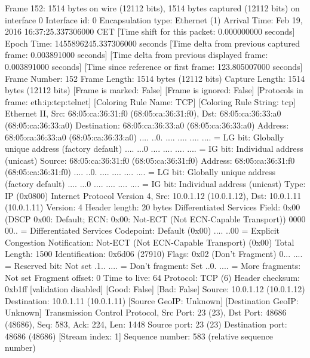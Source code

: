 Frame 152: 1514 bytes on wire (12112 bits), 1514 bytes captured (12112 bits) on interface 0
    Interface id: 0
    Encapsulation type: Ethernet (1)
    Arrival Time: Feb 19, 2016 16:37:25.337306000 CET
    [Time shift for this packet: 0.000000000 seconds]
    Epoch Time: 1455896245.337306000 seconds
    [Time delta from previous captured frame: 0.003891000 seconds]
    [Time delta from previous displayed frame: 0.003891000 seconds]
    [Time since reference or first frame: 123.805007000 seconds]
    Frame Number: 152
    Frame Length: 1514 bytes (12112 bits)
    Capture Length: 1514 bytes (12112 bits)
    [Frame is marked: False]
    [Frame is ignored: False]
    [Protocols in frame: eth:ip:tcp:telnet]
    [Coloring Rule Name: TCP]
    [Coloring Rule String: tcp]
Ethernet II, Src: 68:05:ca:36:31:f0 (68:05:ca:36:31:f0), Dst: 68:05:ca:36:33:a0 (68:05:ca:36:33:a0)
    Destination: 68:05:ca:36:33:a0 (68:05:ca:36:33:a0)
        Address: 68:05:ca:36:33:a0 (68:05:ca:36:33:a0)
        .... ..0. .... .... .... .... = LG bit: Globally unique address (factory default)
        .... ...0 .... .... .... .... = IG bit: Individual address (unicast)
    Source: 68:05:ca:36:31:f0 (68:05:ca:36:31:f0)
        Address: 68:05:ca:36:31:f0 (68:05:ca:36:31:f0)
        .... ..0. .... .... .... .... = LG bit: Globally unique address (factory default)
        .... ...0 .... .... .... .... = IG bit: Individual address (unicast)
    Type: IP (0x0800)
Internet Protocol Version 4, Src: 10.0.1.12 (10.0.1.12), Dst: 10.0.1.11 (10.0.1.11)
    Version: 4
    Header length: 20 bytes
    Differentiated Services Field: 0x00 (DSCP 0x00: Default; ECN: 0x00: Not-ECT (Not ECN-Capable Transport))
        0000 00.. = Differentiated Services Codepoint: Default (0x00)
        .... ..00 = Explicit Congestion Notification: Not-ECT (Not ECN-Capable Transport) (0x00)
    Total Length: 1500
    Identification: 0x6d06 (27910)
    Flags: 0x02 (Don't Fragment)
        0... .... = Reserved bit: Not set
        .1.. .... = Don't fragment: Set
        ..0. .... = More fragments: Not set
    Fragment offset: 0
    Time to live: 64
    Protocol: TCP (6)
    Header checksum: 0xb1ff [validation disabled]
        [Good: False]
        [Bad: False]
    Source: 10.0.1.12 (10.0.1.12)
    Destination: 10.0.1.11 (10.0.1.11)
    [Source GeoIP: Unknown]
    [Destination GeoIP: Unknown]
Transmission Control Protocol, Src Port: 23 (23), Dst Port: 48686 (48686), Seq: 583, Ack: 224, Len: 1448
    Source port: 23 (23)
    Destination port: 48686 (48686)
    [Stream index: 1]
    Sequence number: 583    (relative sequence number)
